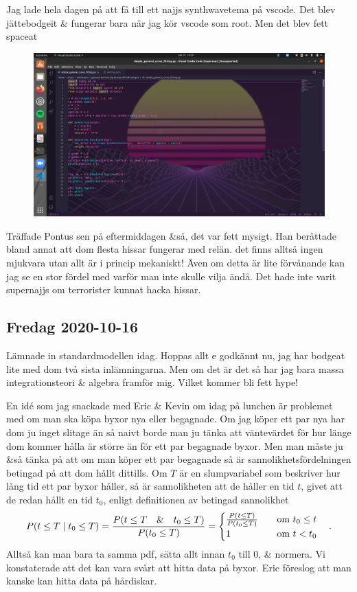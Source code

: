 Jag lade hela dagen på att få till ett najjs synthwavetema på vscode. Det blev jättebodgeit \& fungerar bara när jag kör vscode som root. Men det blev fett spaceat
\begin{figure}[H]
	\centering
	\includegraphics[width=1.0\textwidth]{pics/synthwave_vscode.png}
\end{figure}

Träffade Pontus sen på eftermiddagen \&så, det var fett mysigt. Han berättade bland annat att dom flesta hissar fungerar med relän. det finns alltså ingen mjukvara utan allt är i princip mekaniskt! Även om detta är lite förvånande kan jag se en stor fördel med varför man inte skulle vilja ändå. Det hade inte varit supernajjs om terrorister kunnat hacka hissar.


\subsection{Fredag 2020-10-16}

Lämnade in standardmodellen idag. Hoppas allt e godkännt nu, jag har bodgeat lite med dom två sista inlämningarna. Men om det är det så har jag bara massa integrationsteori \& algebra framför mig. Vilket kommer bli fett hype!

En idé som jag snackade med Eric \& Kevin om idag på lunchen är problemet med om man ska köpa byxor nya eller begagnade.
Om jag köper ett par nya har dom ju inget slitage än så naivt borde man ju tänka att väntevärdet för hur länge dom kommer hålla är större än för ett par begagnade byxor.
Men man måste ju \&så tänka på att om man köper ett par begagnade så är sannolikhetsfördelningen betingad på att dom hållt dittills.
Om $T$ är en slumpvariabel som beskriver hur lång tid ett par byxor håller, så är sannolikheten att de håller en tid $t$, givet att de redan hållt en tid $t_0$, enligt definitionen av betingad sannolikhet
\begin{align}
	P(t \leq T \mid t_0 \leq T) = \frac{P(t \leq T \qq{\&} t_0 \leq T)}{P(t_0 \leq T)} = \begin{cases}
	\frac{P(t \leq T)}{P(t_0 \leq T)} &\qq{om $t_0 \leq t$}\\
	1 &\qq{om $t < t_0$}
	\end{cases}.
\end{align}
Alltså kan man bara ta samma pdf, sätta allt innan $t_0$ till $0$, \& normera.
Vi konstaterade att det kan vara svårt att hitta data på byxor. Eric föreslog att man kanske kan hitta data på hårdiskar.

 
